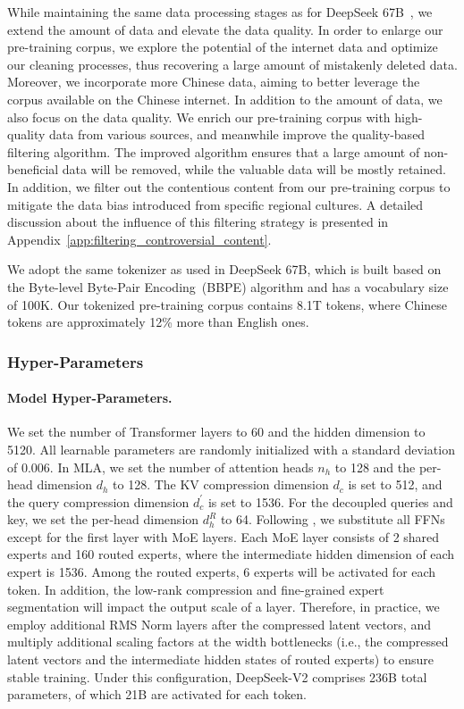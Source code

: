 While maintaining the same data processing stages as for DeepSeek 67B~\citep{deepseek1}, we extend the amount of data and elevate the data quality. In order to enlarge our pre-training corpus, we explore the potential of the internet data and optimize our cleaning processes, thus recovering a large amount of mistakenly deleted data. Moreover, we incorporate more Chinese data, aiming to better leverage the corpus available on the Chinese internet. In addition to the amount of data, we also focus on the data quality. We enrich our pre-training corpus with high-quality data from various sources, and meanwhile improve the quality-based filtering algorithm. The improved algorithm ensures that a large amount of non-beneficial data will be removed, while the valuable data will be mostly retained. In addition, we filter out the contentious content from our pre-training corpus to mitigate the data bias introduced from specific regional cultures. A detailed discussion about the influence of this filtering strategy is presented in Appendix~\ref{app:filtering_controversial_content}. 

We adopt the same tokenizer as used in DeepSeek 67B, which is built based on the Byte-level Byte-Pair Encoding~(BBPE) algorithm and has a vocabulary size of 100K. Our tokenized pre-training corpus contains 8.1T tokens, where Chinese tokens are approximately 12\% more than English ones. 

\subsubsection{Hyper-Parameters}

\paragraph{Model Hyper-Parameters.} We set the number of Transformer layers to 60 and the hidden dimension to 5120. All learnable parameters are randomly initialized with a standard deviation of 0.006. In MLA, we set the number of attention heads $n_h$ to 128 and the per-head dimension $d_h$ to 128. The KV compression dimension $d_c$ is set to 512, and the query compression dimension $d_c^{\prime}$ is set to 1536. For the decoupled queries and key, we set the per-head dimension $d_h^R$ to 64. Following \citet{deepseekmoe}, we substitute all FFNs except for the first layer with MoE layers. Each MoE layer consists of 2 shared experts and 160 routed experts, where the intermediate hidden dimension of each expert is 1536. Among the routed experts, 6 experts will be activated for each token. In addition, the low-rank compression and fine-grained expert segmentation will impact the output scale of a layer. Therefore, in practice, we employ additional RMS Norm layers after the compressed latent vectors, and multiply additional scaling factors at the width bottlenecks (i.e., the compressed latent vectors and the intermediate hidden states of routed experts) to ensure stable training. Under this configuration, DeepSeek-V2 comprises 236B total parameters, of which 21B are activated for each token. 

